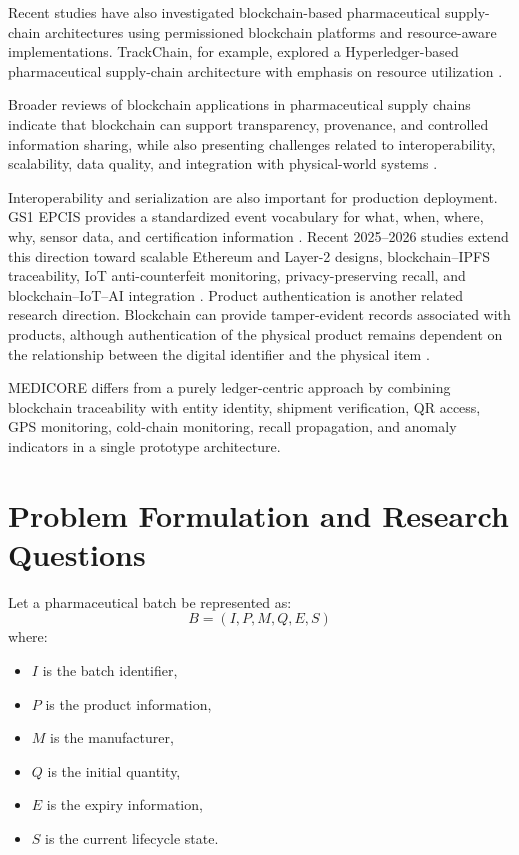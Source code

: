 \documentclass[11pt,a4paper]{article}
\begin{document}
Recent studies have also investigated blockchain-based pharmaceutical supply-chain architectures using permissioned blockchain platforms and resource-aware implementations. TrackChain, for example, explored a Hyperledger-based pharmaceutical supply-chain architecture with emphasis on resource utilization \cite{nagasudha2024trackchain}.

Broader reviews of blockchain applications in pharmaceutical supply chains indicate that blockchain can support transparency, provenance, and controlled information sharing, while also presenting challenges related to interoperability, scalability, data quality, and integration with physical-world systems \cite{akram2024blockchain}.

Interoperability and serialization are also important for production deployment. GS1 EPCIS provides a standardized event vocabulary for what, when, where, why, sensor data, and certification information \cite{gs12024epcis,gs12024healthcare,gs12017global}. Recent 2025--2026 studies extend this direction toward scalable Ethereum and Layer-2 designs, blockchain--IPFS traceability, IoT anti-counterfeit monitoring, privacy-preserving recall, and blockchain--IoT--AI integration \cite{dutta2026blockchain,hasan2026blockchain,rajak2026scalable,drugtrace2026,zk2026privacy,devi2025blockchain,siyal2026traceability}. Product authentication is another related research direction. Blockchain can provide tamper-evident records associated with products, although authentication of the physical product remains dependent on the relationship between the digital identifier and the physical item \cite{henrichs2025quantum}.

MEDICORE differs from a purely ledger-centric approach by combining blockchain traceability with entity identity, shipment verification, QR access, GPS monitoring, cold-chain monitoring, recall propagation, and anomaly indicators in a single prototype architecture.

\section{Problem Formulation and Research Questions}
Let a pharmaceutical batch be represented as:
\begin{equation}
B = (I, P, M, Q, E, S)
\end{equation}
where:
\begin{itemize}
    \item $I$ is the batch identifier,
    \item $P$ is the product information,
    \item $M$ is the manufacturer,
    \item $Q$ is the initial quantity,
    \item $E$ is the expiry information,
    \item $S$ is the current lifecycle state.
\end{itemize}
\end{document}
